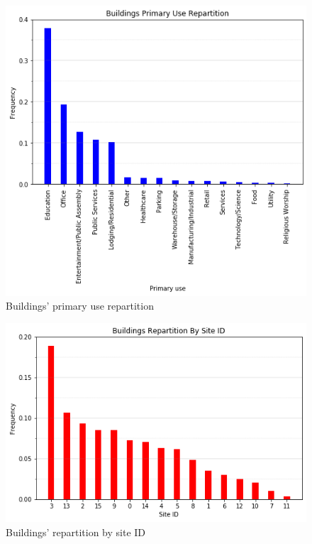 \documentclass[twocolumn, switch]{article}
\begin{document}
\begin{figure}[H]
\centering
\includegraphics[scale=0.35]{../graphs/buildings_primary_use_repartition}
\caption{Buildings' primary use repartition}
\label{fig:buildings_primary_use_repartition}
\end{figure}

\begin{figure}[H]
\centering
\includegraphics[scale=0.35]{../graphs/buildings_repartition_by_site_id}
\caption{Buildings' repartition by site ID}
\label{fig:buildings_repartition_by_site_id}
\end{figure}
\end{document}
